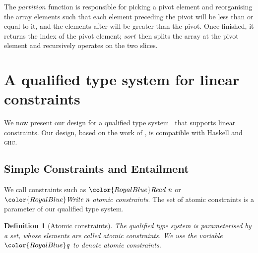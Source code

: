 \documentclass[acmsmall,usenames,dvipsnames,natbib=false,acmthm=false,screen]{acmart}
\newcommand{\Conid}[1]{\mathit{#1}}
\newcommand{\Varid}[1]{\mathit{#1}}
\newcommand{\constraintcolour}{\color{RoyalBlue}}
\newcommand{\constraintfont}[1]{{\constraintcolour#1}}
\theoremstyle{acmplain}
\theoremstyle{acmdefinition}
\newtheorem{definition}[theorem]{Definition}
\begin{document}
%
The \ensuremath{\Varid{partition}} function is responsible for picking a pivot element and
reorganising the array elements such that each element preceding the pivot will
be less than or equal to it, and the elements after will be greater than the
pivot. Once finished, it returns the index of the pivot element; \ensuremath{\Varid{sort}} then
splits the array at the pivot element and recursively operates on the two
slices.

\section{A qualified type system for linear constraints}
\label{sec:qualified-type-system}

We
now present our design for a qualified type system~\cite{QualifiedTypes} that supports
linear constraints. Our design, based on the work of \citet{OutsideIn}, is compatible with Haskell and \textsc{ghc}.


\subsection{Simple Constraints and Entailment}
\label{sec:constraint-domain}

We call constraints such as
\ensuremath{\constraintfont{\Conid{Read}\;\Varid{n}}} or \ensuremath{\constraintfont{\Conid{Write}\;\Varid{n}}} \emph{atomic
  constraints}. The set of atomic constraints is a parameter of our
qualified type system.

\begin{definition}[Atomic constraints]
  The qualified type system is parameterised by a set, whose elements
  are called \emph{atomic constraints}. We use the variable $  \constraintfont{ \ottnt{q} }  $
  to denote atomic constraints.
\end{definition}
\end{document}
